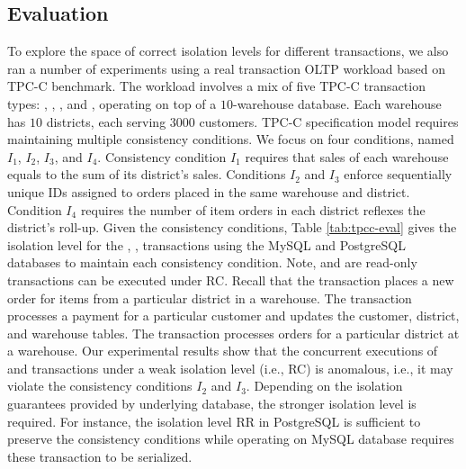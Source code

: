 \subsection{Evaluation}

To explore the space of correct isolation levels for different transactions, we  also  ran a number  of experiments using  a real transaction OLTP workload   based on TPC-C benchmark.  
 The  workload  involves  a mix of five TPC-C transaction types: 
,  ,  ,  and  , 
operating on top of  a $10$-warehouse database.  
Each warehouse has  $10$ districts, each serving $3000$ customers. 
TPC-C  specification model  requires  maintaining multiple   consistency conditions.  We focus  on   four conditions, named $I_1$, $I_2$, $I_3$, and $I_4$.   
Consistency condition $I_1$  requires that  sales of each  warehouse  equals to the  sum of    its  district's sales.  Conditions $I_2$ and $I_3$  enforce  
 sequentially unique IDs assigned to  orders placed in the same   warehouse and district. Condition $I_4$ requires 
 the  number of  item orders   in each district 
  reflexes  the district's roll-up. 
Given the consistency conditions,  Table  \ref{tab:tpcc-eval} gives the isolation level  for the ,  ,   transactions using the  MySQL and PostgreSQL databases   to maintain   each consistency condition. Note,    and     are read-only transactions can be executed under RC.   
Recall that the  transaction places a new order for
 items from a particular district in a warehouse.  
The  transaction  processes  a payment for a particular customer and updates the customer, district, and warehouse tables. 
 The    transaction processes  orders for a particular   district at  a warehouse. 
 Our experimental results  show that  the concurrent executions of      
    and   transactions under a weak isolation level (i.e.,  RC) is anomalous, i.e., it may violate the consistency conditions $I_2$ and $I_3$. Depending on the isolation guarantees provided  by  underlying database,   the stronger  isolation level is required. For instance, the isolation level RR in PostgreSQL  is sufficient to preserve the consistency  conditions while  operating on MySQL database  requires  these transaction to be serialized.  


